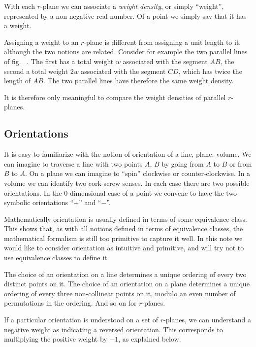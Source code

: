 \documentclass[\ifafour a4paper,12pt,\else a5paper,10pt,\fi%
onecolumn,oneside,article,%
british%
]{memoir}
\theoremstyle{remark}
\theoremstyle{innote}
\renewcommand*{\|}{\nonscript\,\vert\nonscript\;\mathopen{}}
\newcommand*{\fig}{fig.}%
\newcommand*{\puzzle}{{\fontencoding{U}\fontfamily{fontawesometwo}\selectfont\symbol{225}}}
\newcommand{\mynote}[1]{ {\color{notecolour}\puzzle\ #1}}
\newcommand*{\yr}{r}
\newcommand*{\yw}{w}
\begin{document}
With each $\yr$-plane we can associate a \emph{weight density}, or simply
\enquote{weight}, represented by a non-negative real number. Of a point we
simply say that it has a weight.

Assigning a weight to an $\yr$-plane is different from assigning a unit
length to it, although the two notions are related. Consider for example
the two parallel lines of \fig\mynote{}. The first has a total weight $\yw$
associated with the segment $AB$, the second a total weight $2\yw$
associated with the segment $CD$, which has twice the length of $AB$. The two
parallel lines have therefore the same weight density.

It is therefore only meaningful to compare the weight densities of parallel
$\yr$-planes.


\subsection{Orientations}
\label{sec:orientations2}

It is easy to familiarize with the notion of orientation of a line, plane,
volume. We can imagine to traverse a line with two points $A$, $B$ by going
from $A$ to $B$ or from $B$ to $A$. On a plane we can imagine to
\enquote{spin} clockwise or counter-clockwise. In a volume we can identify
two cork-screw senses. In each case there are two possible orientations. In
the $0$-dimensional case of a point we convene to have the two symbolic
orientations \enquote{$+$} and \enquote{$-$}. 

Mathematically orientation is usually defined in terms of some equivalence
class. This shows that, as with all notions defined in terms of equivalence
classes, the mathematical formalism is still too primitive to capture it
well. In this note we would like to consider orientation as intuitive and
primitive, and will try not to use equivalence classes to define it.

The choice of an orientation on a line determines a unique ordering of
every two distinct points on it. The choice of an orientation on a plane
determines a unique ordering of every three non-collinear points on it,
modulo an even number of permutations in the ordering. And so on for
$\yr$-planes.

If a particular orientation is understood on a set of $\yr$-planes, we can
understand a negative weight as indicating a reversed orientation. This
corresponds to multiplying the positive weight by $-1$, as explained below.
\end{document}
